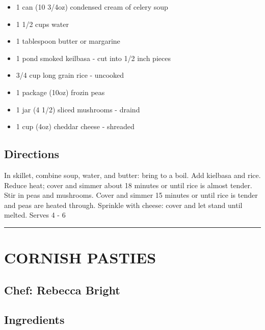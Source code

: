 \documentclass[
]{book}
\providecommand{\tightlist}{%
  \setlength{\itemsep}{0pt}\setlength{\parskip}{0pt}}
\begin{document}
\begin{itemize}
\tightlist
\item
  1 can (10 3/4oz) condensed cream of celery soup
\item
  1 1/2 cups water
\item
  1 tablespoon butter or margarine
\item
  1 pond smoked keilbasa - cut into 1/2 inch pieces
\item
  3/4 cup long grain rice - uncooked
\item
  1 package (10oz) frozin peas
\item
  1 jar (4 1/2) sliced mushrooms - draind
\item
  1 cup (4oz) cheddar cheese - shreaded
\end{itemize}

\hypertarget{directions-51}{%
\subsection*{Directions}\label{directions-51}}


In skillet, combine soup, water, and butter: bring to a boil. Add kielbasa and rice. Reduce heat; cover and simmer about 18 minutes or until rice is almost tender. Stir in peas and mushrooms. Cover and simmer 15 minutes or until rice is tender and peas are heated through. Sprinkle with cheese: cover and let stand until melted. Serves 4 - 6

\begin{center}\rule{0.5\linewidth}{0.5pt}\end{center}

\hypertarget{cornish-pasties}{%
\section*{CORNISH PASTIES}\label{cornish-pasties}}


\hypertarget{chef-rebecca-bright}{%
\subsection*{Chef: Rebecca Bright}\label{chef-rebecca-bright}}


\hypertarget{ingredients-52}{%
\subsection*{Ingredients}\label{ingredients-52}}
\end{document}
